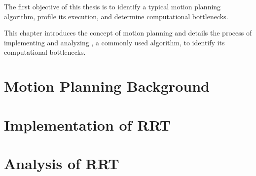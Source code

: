
The first objective of this thesis is to identify a typical motion planning algorithm, profile its execution, and determine computational bottlenecks.

This chapter introduces the concept of motion planning and details the process of implementing and analyzing , a commonly used algorithm, to identify its computational bottlenecks.\\

\section{Motion Planning Background} 
\label{section:motion_planning_background}
    

\newpage
\section{Implementation of RRT}
\label{section:rrt}
    

\newpage
\section{Analysis of RRT}
\label{section:rrt_analysis}
    